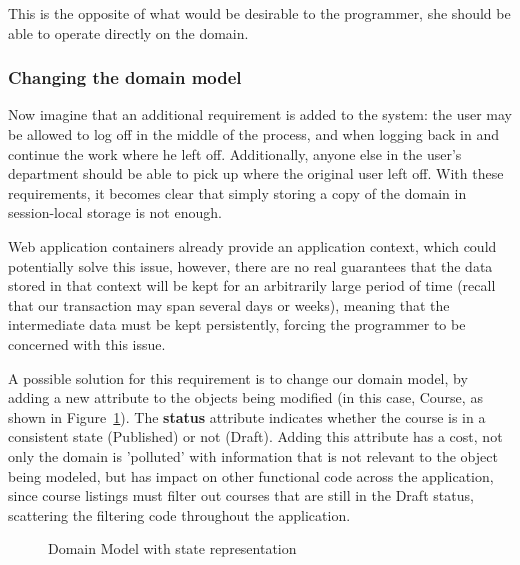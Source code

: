 \documentclass{llncs}
\begin{document}
This is the opposite of what would be desirable to the programmer, she
should be able to operate directly on the domain.

\subsubsection{Changing the domain model}

Now imagine that an additional requirement is added to the system: the
user may be allowed to log off in the middle of the process, and when
logging back in and continue the work where he left off. Additionally,
anyone else in the user's department should be able to pick up where
the original user left off. With these requirements, it becomes clear
that simply storing a copy of the domain in session-local storage is
not enough. 

Web application containers already provide an application context,
which could potentially solve this issue, however, there are no real
guarantees that the data stored in that context will be kept for an
arbitrarily large period of time (recall that our transaction may span
several days or weeks), meaning that the intermediate data must be
kept persistently, forcing the programmer to be concerned with this
issue.

A possible solution for this requirement is to change our domain
model, by adding a new attribute to the objects being modified (in
this case, Course, as shown in
Figure~\ref{fig:courseDomainState}). The {\bf status} attribute
indicates whether the course is in a consistent state (Published) or
not (Draft). Adding this attribute has a cost, not only the domain is
'polluted' with information that is not relevant to the object being
modeled, but has impact on other functional code across the
application, since course listings must filter out courses that are
still in the Draft status, scattering the filtering code throughout
the application.

\begin{figure}
\centering
{}

\caption{Domain Model with state representation} 
\label{fig:courseDomainState}

\end{figure}
\end{document}
